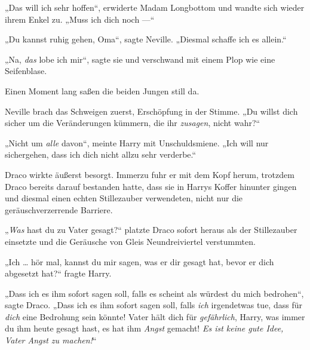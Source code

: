 „Das will ich sehr hoffen“, erwiderte Madam Longbottom und wandte sich wieder ihrem Enkel zu.
„Muss ich dich noch —“

„Du kannst ruhig gehen, Oma“, sagte Neville.
„Diesmal schaffe ich es allein.“

„Na, \emph{das} lobe ich mir“, sagte sie und verschwand mit einem Plop wie eine Seifenblase.

Einen Moment lang saßen die beiden Jungen still da.

Neville brach das Schweigen zuerst, Erschöpfung in der Stimme.
„Du willst dich sicher um die Veränderungen kümmern, die ihr \emph{zusagen}, nicht wahr?“

„Nicht um \emph{alle} davon“, meinte Harry mit Unschuldsmiene.
„Ich will nur sichergehen, dass ich dich nicht allzu sehr verderbe.“

\later

Draco wirkte äußerst besorgt. Immerzu fuhr er mit dem Kopf herum, trotzdem Draco bereits darauf bestanden hatte, dass sie in Harrys Koffer hinunter gingen und diesmal einen echten Stillezauber verwendeten, nicht nur die geräuschverzerrende Barriere.

„\emph{Was} hast du zu Vater gesagt?“ platzte Draco sofort heraus als der Stillezauber einsetzte und die Geräusche von Gleis Neundreiviertel verstummten.

„Ich … hör mal, kannst du mir sagen, was er dir gesagt hat, bevor er dich abgesetzt hat?“ fragte Harry.

„Dass ich es ihm sofort sagen soll, falls es scheint als würdest du mich bedrohen“, sagte Draco.
„Dass ich es ihm sofort sagen soll, falls \emph{ich} irgendetwas tue, dass für \emph{dich} eine Bedrohung sein könnte! Vater hält dich für \emph{gefährlich}, Harry, was immer du ihm heute gesagt hast, es hat ihm \emph{Angst} gemacht! \emph{Es ist keine gute Idee, Vater Angst zu machen!}“

